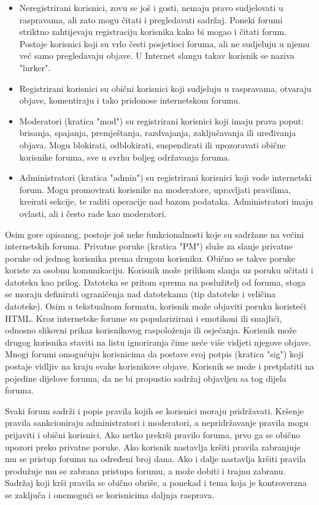 \documentclass{foi}
\begin{document}
\begin{itemize}
\item Neregistrirani korisnici, zovu se još i gosti, nemaju pravo sudjelovati u raspravama, ali zato mogu čitati i pregledavati sadržaj. Poneki forumi striktno zahtijevaju registraciju korisnika kako bi mogao i čitati forum. Postoje korisnici koji su vrlo česti posjetioci foruma, ali ne sudjeluju u njemu već samo pregledavaju objave. U Internet slangu takav korisnik se naziva "lurker".\cite{lurker}
\item Registrirani korisnici su obični korisnici koji sudjeluju u raspravama, otvaraju objave, komentiraju i tako pridonose internetskom forumu.
\item Moderatori (kratica "mod") su registrirani korisnici koji imaju prava poput: brisanja, spajanja, premještanja, razdvajanja, zaključavanja ili uređivanja objava. Mogu blokirati, odblokirati, suspendirati ili upozoravati obične korisnike foruma, sve u svrhu boljeg održavanja foruma.
\item Administratori (kratica "admin") su registrirani korisnici koji vode internetski forum. Mogu promovirati korisnike na moderatore, upravljati pravilima, kreirati sekcije, te raditi operacije nad bazom podataka. Administratori imaju ovlasti, ali i često rade kao moderatori.\cite{adminvsmoderator}
\end{itemize}

Osim gore opisanog, postoje još neke funkcionalnosti koje su sadržane na većini internetskih foruma. Privatne poruke (kratica "PM") služe za slanje privatne poruke od jednog korisnika prema drugom korisniku. Obično se takve poruke koriste za osobnu komunikaciju. Korisnik može prilikom slanja uz poruku učitati i datoteku kao prilog. Datoteka se pritom sprema na poslužitelj od foruma, stoga se moraju definirati ograničenja nad datotekama (tip datoteke i veličina datoteke). Osim u tekstualnom formatu, korisnik može objaviti poruku koristeći HTML. Kroz internetske forume su popularizirani i emotikoni ili smajlići, odnosno slikovni prikaz korisnikovog raspoloženja ili osjećanja. Korisnik može drugog korisnika staviti na listu ignoriranja čime neće više vidjeti njegove objave. Mnogi forumi omogućuju korisnicima da postave svoj potpis (kratica "sig") koji postaje vidljiv na kraju svake korisnikove objave. Korisnik se može i pretplatiti na pojedine dijelove foruma, da ne bi propustio sadržaj objavljen sa tog dijela foruma.\cite{vbulletinhelp}

Svaki forum sadrži i popis pravila kojih se korisnici moraju pridržavati. Kršenje pravila sankcioniraju administratori i moderatori, a nepridržavanje pravila mogu prijaviti i obični korisnici. Ako netko prekrši pravilo foruma, prvo ga se obično upozori preko privatne poruke. Ako korisnik nastavlja kršiti pravila zabranjuje mu se pristup forumu na određeni broj dana. Ako i dalje nastavlja kršiti pravila produžuje mu se zabrana pristupa forumu, a može dobiti i trajnu zabranu. Sadržaj koji krši pravila se obično obriše, a ponekad i tema koja je kontroverzna se zaključa i onemogući se korisnicima daljnja rasprava. \cite{rules}
\end{document}

